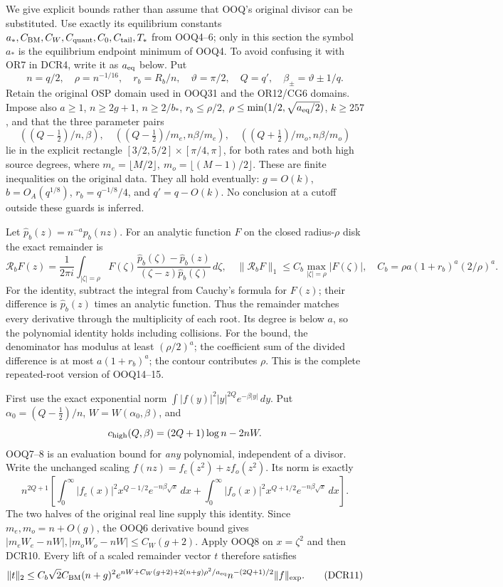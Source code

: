 \documentclass[11pt]{article}
\begin{document}
We give explicit bounds rather than assume that OOQ's original divisor
can be substituted. Use exactly its equilibrium constants
\(a_*,C_{\rm BM},C_W,C_{\rm quant},C_0,C_{\rm tail},T_*\)
from OOQ4--6; only in this section the symbol \(a_*\) is the
equilibrium endpoint minimum of OOQ4. To avoid confusing it with
OR7 in DCR4, write it as \(a_{\rm eq}\) below.
Put
\[
n=q/2,\quad \rho=n^{-1/16},\quad
r_b=R_b/n,\quad \vartheta=\pi/2,\quad
Q=q',\quad \beta_\pm=\vartheta\pm1/q.
\tag{DCR9}
\]
Retain the original OSP domain used in OOQ31 and the OR12/CG6
domains. Impose also \(a\ge1\), \(n\ge2g+1\), \(n\ge2/b_*\),
\(r_b\le\rho/2\), \(\rho\le\min(1/2,\sqrt{a_{\rm eq}/2})\),
\(k\ge257\), and that the three parameter pairs
\[
((Q-\tfrac12)/n,\beta),\quad
((Q-\tfrac12)/m_e,n\beta/m_e),\quad
((Q+\tfrac12)/m_o,n\beta/m_o)
\]
lie in the explicit rectangle \([3/2,5/2]\times[\pi/4,\pi]\),
for both rates and both high source degrees, where
\(m_e=\lfloor M/2\rfloor,\ m_o=\lfloor(M-1)/2\rfloor\).
These are finite inequalities on the original data.
They all hold eventually: \(g=O(k)\), \(b=O_A(q^{1/8})\),
\(r_b=q^{-1/8}/4\), and \(q'=q-O(k)\).
No conclusion at a cutoff outside these guards is inferred.

Let \(\widehat p_b(z)=n^{-a}p_b(nz)\). For an analytic function \(F\)
on the closed radius-\(\rho\) disk the exact remainder is
\[
\mathcal R_bF(z)=\frac1{2\pi i}\int_{|\zeta|=\rho}
 F(\zeta)\frac{\widehat p_b(\zeta)-\widehat p_b(z)}
 {(\zeta-z)\widehat p_b(\zeta)}\,d\zeta,\quad
\|\mathcal R_bF\|_1\le C_b\max_{|\zeta|=\rho}|F(\zeta)|,
\quad
C_b=\rho a(1+r_b)^a(2/\rho)^a.
\tag{DCR10}
\]
For the identity, subtract the integral from Cauchy's formula for
\(F(z)\); their difference is \(\widehat p_b(z)\) times an analytic
function. Thus the remainder matches every derivative through the
multiplicity of each root. Its degree is below \(a\), so the polynomial
identity holds including collisions. For the bound, the denominator
has modulus at least \((\rho/2)^a\); the coefficient sum of the
divided difference is at most \(a(1+r_b)^a\); the contour contributes
\(\rho\). This is the complete repeated-root version of OOQ14--15.

First use the exact exponential norm
\(\int |f(y)|^2|y|^{2Q}e^{-\beta|y|}\,dy\).
Put \(\alpha_0=(Q-\tfrac12)/n\),
\(W=W(\alpha_0,\beta)\), and
\[
c_{\rm high}(Q,\beta)=(2Q+1)\log n-2nW.
\]
OOQ7--8 is an evaluation bound for \emph{any} polynomial, independent
of a divisor. Write the unchanged scaling
\(f(nz)=f_e(z^2)+zf_o(z^2)\). Its norm is exactly
\[
 n^{2Q+1}\left[
 \int_0^\infty |f_e(x)|^2x^{Q-1/2}e^{-n\beta\sqrt x}\,dx+
 \int_0^\infty |f_o(x)|^2x^{Q+1/2}e^{-n\beta\sqrt x}\,dx\right].
\]
The two halves of the original real line supply this identity.
Since \(m_e,m_o=n+O(g)\), the OOQ6 derivative bound gives
\(|m_eW_e-nW|,|m_oW_o-nW|\le C_W(g+2)\).
Apply OOQ8 on \(x=\zeta^2\) and then DCR10. Every lift of a
scaled remainder vector \(t\) therefore satisfies
\[
 \|t\|_2\le C_b\sqrt2 C_{\rm BM}(n+g)^2
 e^{nW+C_W(g+2)+2(n+g)\rho^2/a_{\rm eq}}
 n^{-(2Q+1)/2}\|f\|_{\exp}.
\tag{DCR11}
\]
\end{document}

